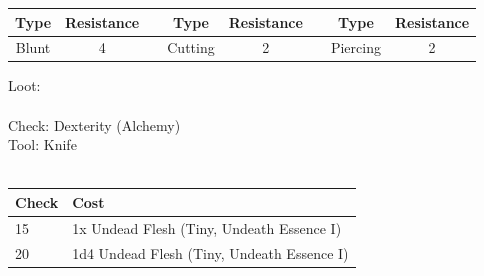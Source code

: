 \begin{minipage}[H]{1\textwidth}
    \centering
    \begin{tabular}[c]{|c | c | c | c | c | c | c | c|}
        \hline
        Type & Resistance && Type & Resistance && Type & Resistance\\
        \hline
        Blunt & 4 &&
        Cutting & 2 &&
        Piercing & 2\\
        \hline
    \end{tabular}
\end{minipage}
Loot:\\
\\
Check: Dexterity (Alchemy)\\
Tool: Knife\\
\\
\begin{minipage}{0.8\textwidth}
    \begin{tabular}{|l | l|}
        \hline
        Check & Cost\\
        \hline
        15 & 1x Undead Flesh (Tiny, Undeath Essence I)\\
        20 & 1d4 Undead Flesh (Tiny, Undeath Essence I)\\
        \hline
    \end{tabular}
\end{minipage}
\pagebreak
